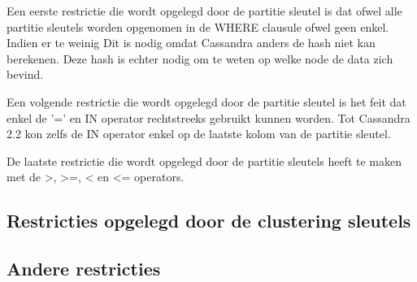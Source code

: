 Een eerste restrictie die wordt opgelegd door de partitie sleutel is dat ofwel alle partitie sleutels worden opgenomen in de WHERE clausule ofwel geen enkel.
Indien er te weinig 
Dit is nodig omdat Cassandra anders de hash niet kan berekenen.
Deze hash is echter nodig om te weten op welke node de data zich bevind.

Een volgende restrictie die wordt opgelegd door de partitie sleutel is het feit dat enkel de '=' en IN operator rechtstreeks gebruikt kunnen worden.
Tot Cassandra 2.2 kon zelfs de IN operator enkel op de laatste kolom van de partitie sleutel.

De laatste restrictie die wordt opgelegd door de partitie sleutels heeft te maken met de >, >=, < en <= operators.

\subsection{Restricties opgelegd door de clustering sleutels}

\subsection{Andere restricties}
